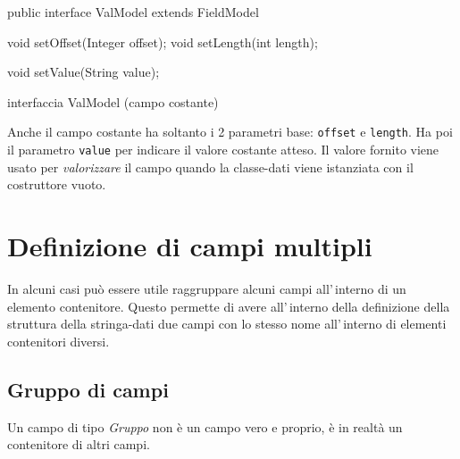 \documentclass[a4paper,10pt]{report}
\newif\ifesource
\newenvironment{elisting}[1][H]
  {\captionsetup{aboveskip=0pt}\begin{listing}[#1]}
  {\end{listing}%
}
\begin{document}
\ifesource
\begin{figure*}[!htb]
\begin{lstlisting}[language=java, 
caption=interfaccia ValModel (campo costante), 
label=lst:ValModel]
public interface ValModel extends FieldModel {
    void setOffset(Integer offset);
    void setLength(int length);
    
    void setValue(String value);
}
\end{lstlisting}\index{ValModel}
\end{figure*}
\else
\begin{elisting}[!htb]
\begin{javacode}
public interface ValModel extends FieldModel {
    void setOffset(Integer offset);
    void setLength(int length);
    
    void setValue(String value);
}
\end{javacode}
\caption{interfaccia ValModel (campo costante)}
\label{lst:ValModel}
\end{elisting}
\fi

Anche il campo costante ha soltanto i 2 parametri base: \verb!offset! e 
\verb!length!.
Ha poi il parametro \verb!value! per indicare il valore costante atteso.
Il valore fornito viene usato per \textit{valorizzare} il campo quando la 
classe-dati viene istanziata con il costruttore vuoto.

\chapter{Definizione di campi multipli}
In alcuni casi può essere utile raggruppare alcuni campi all'\,interno di un
elemento contenitore. Questo permette di avere all'\,interno della definizione
della struttura della stringa-dati due campi con lo stesso nome all'\,interno
di elementi contenitori diversi.

\section{Gruppo di campi}
Un campo di tipo \textsl{Gruppo} non è un campo vero e proprio, è in realtà un
contenitore di altri campi.
\end{document}
